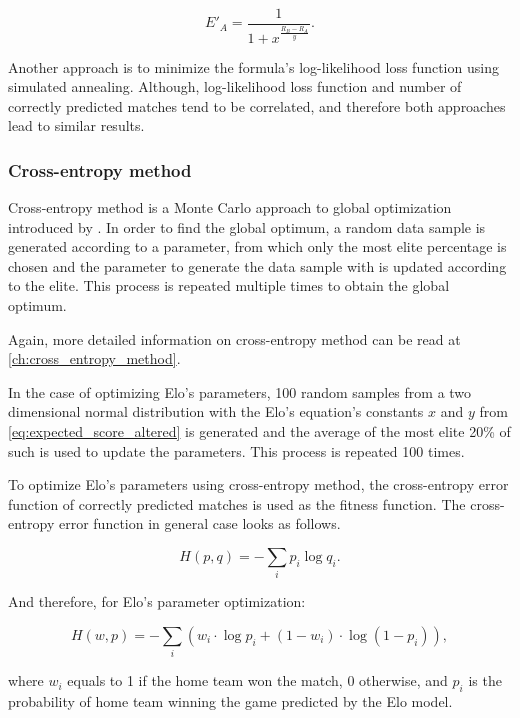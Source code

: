 \begin{equation}
\label{eq:expected_score_altered}
E'_A = \frac{1}{1+x^\frac{R_B-R_A}{y}}.
\end{equation}

Another approach is to minimize the formula's log-likelihood loss function \citep{BujaLossFunctionsBinary2005} using simulated annealing. Although, log-likelihood loss function and number of correctly predicted matches tend to be correlated, and therefore both approaches lead to similar results.

\subsubsection{Cross-entropy method}
Cross-entropy method is a Monte Carlo approach to global optimization introduced by  \citet{RubinsteinCrossEntropyMethodCombinatorial1999}. In order to find the global optimum, a random data sample is generated according to a parameter, from which only the most elite percentage is chosen and the parameter to generate the data sample with is updated according to the elite. This process is repeated multiple times to obtain the global optimum.

Again, more detailed information on cross-entropy method can be read at \autoref{ch:cross_entropy_method}.

In the case of optimizing Elo's parameters, 100 random samples from a two dimensional normal distribution with the Elo's equation's constants $x$ and $y$ from \eqref{eq:expected_score_altered} is generated and the average of the most elite 20\% of such is used to update the parameters. This process is repeated 100 times.

To optimize Elo's parameters using cross-entropy method, the cross-entropy error function \citep{deBoerTutorialCrossEntropyMethod2005} of correctly predicted matches is used as the fitness function. The cross-entropy error function in general case looks as follows.

\begin{equation*}
H(p, q) = -\sum_i{p_i\log{q_i}}.
\end{equation*}

And therefore, for Elo's parameter optimization:

\begin{equation*}
H(w, p) = -\sum_i{(w_i\cdot\log{p_i} + (1-w_i)\cdot\log{(1-p_i)})},
\end{equation*}

\noindent where $w_i$ equals to 1 if the home team won the match, 0 otherwise, and $p_i$ is the probability of home team winning the game predicted by the Elo model.

